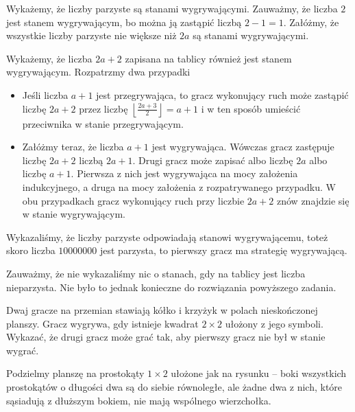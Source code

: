 \noindent
Wykażemy, że liczby parzyste są stanami wygrywającymi. Zauważmy, że liczba $2$ jest stanem wygrywającym, bo można ją zastąpić liczbą $2 - 1 = 1$. Załóżmy, że wszystkie liczby parzyste nie większe niż $2a$ są stanami wygrywającymi.

\vspace{10px}
\noindent
Wykażemy, że liczba $2a + 2$ zapisana na tablicy również jest stanem wygrywającym. Rozpatrzmy dwa przypadki
\begin{itemize}
	\item Jeśli liczba $a + 1$ jest przegrywająca, to gracz wykonujący ruch może zastąpić liczbę $2a + 2$ przez liczbę $\left\lfloor\frac{2a + 3}{2}\right\rfloor = a + 1$ i w ten sposób umieścić przeciwnika w stanie przegrywającym.
	\item Załóżmy teraz, że liczba $a + 1$ jest wygrywająca. Wówczas gracz zastępuje liczbę $2a + 2$ liczbą $2a + 1$. Drugi gracz może zapisać albo liczbę $2a$ albo liczbę $a + 1$. Pierwsza z nich jest wygrywająca na mocy założenia indukcyjnego, a druga na mocy założenia z rozpatrywanego przypadku. W obu przypadkach gracz wykonujący ruch przy liczbie $2a + 2$ znów znajdzie się w stanie wygrywającym.
\end{itemize}

\vspace{10px}
\noindent
Wykazaliśmy, że liczby parzyste odpowiadają stanowi wygrywającemu, toteż skoro liczba $10000000$ jest parzysta, to pierwszy gracz ma strategię wygrywającą.

\begin{remark}
	Zauważmy, że nie wykazaliśmy nic o stanach, gdy na tablicy jest liczba nieparzysta. Nie było to jednak konieczne do rozwiązania powyższego zadania.
\end{remark}

\newpage

\begin{problem}{4}
	Dwaj gracze na przemian stawiają kółko i krzyżyk w polach nieskończonej planszy. Gracz wygrywa, gdy istnieje kwadrat $2\times2$ ułożony z jego symboli. Wykazać, że drugi gracz może grać tak, aby pierwszy gracz nie był w stanie wygrać.
\end{problem}

\noindent
Podzielmy planszę na prostokąty $1 \times 2$ ułożone jak na rysunku -- boki wszystkich prostokątów o długości dwa są do siebie równoległe, ale żadne dwa z nich, które sąsiadują z dłuższym bokiem, nie mają wspólnego wierzchołka.


